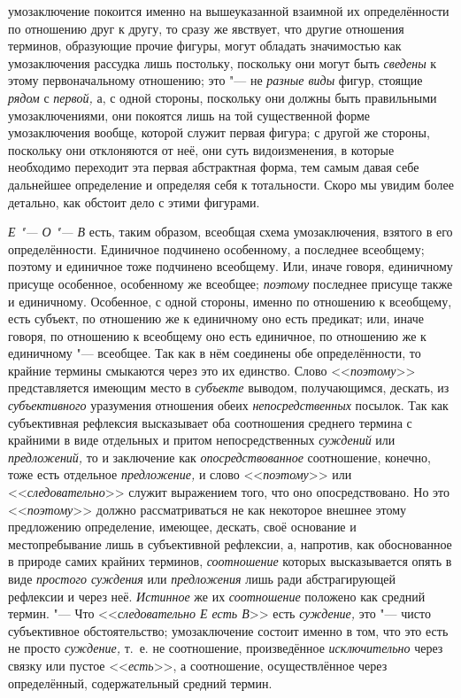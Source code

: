 умозаключение покоится именно на вышеуказанной взаимной их определённости
по отношению друг к другу, то сразу же явствует, что другие отношения
терминов, образующие прочие фигуры, могут обладать значимостью как
умозаключения рассудка лишь постольку, поскольку они могут быть
{\em сведены} к этому
первоначальному отношению; это "--- не
{\em разные виды} фигур,
стоящие {\em рядом} с
{\em первой,} а, с одной
стороны, поскольку они должны быть правильными умозаключениями, они
покоятся лишь на той существенной форме умозаключения вообще, которой
служит первая фигура; с другой же стороны, поскольку они отклоняются от
неё, они суть видоизменения, в которые необходимо переходит эта первая
абстрактная форма, тем самым давая себе дальнейшее определение и определяя
себя к тотальности. Скоро мы увидим более детально, как обстоит дело с
этими фигурами.

{\em Е "--- О "--- В} есть, таким образом, всеобщая схема
умозаключения, взятого в его определённости. Единичное подчинено
особенному, а последнее всеобщему; поэтому и единичное тоже подчинено
всеобщему. Или, иначе говоря, единичному присуще особенное, особенному же
всеобщее; {\em поэтому}
последнее присуще также и единичному. Особенное, с одной
стороны, именно по отношению к всеобщему, есть субъект, по отношению же к
единичному оно есть предикат; или, иначе говоря, по отношению к всеобщему
оно есть единичное, по отношению же к единичному "--- всеобщее.
Так как в нём соединены обе определённости, то крайние термины смыкаются
через это их единство. Слово
<<{\em поэтому}>>
представляется имеющим место в
{\em субъекте} выводом,
получающимся, дескать, из
{\em субъективного}
уразумения отношения обеих
{\em непосредственных}
посылок. Так как субъективная рефлексия высказывает оба
соотношения среднего термина с крайними в виде отдельных и притом
непосредственных {\em суждений}
или {\em предложений,}
то и заключение как
{\em опосредствованное}
соотношение, конечно, тоже есть отдельное
{\em предложение,} и
слово <<{\em поэтому}>> или
<<{\em следовательно}>>
служит выражением того, что оно опосредствовано. Но это
<<{\em поэтому}>> должно
рассматриваться не как некоторое внешнее этому предложению определение,
имеющее, дескать, своё основание и местопребывание лишь в субъективной
рефлексии, а, напротив, как обоснованное в природе самих крайних терминов,
{\em соотношение} которых
высказывается опять в виде {\em простого
суждения} или
{\em предложения} лишь
ради абстрагирующей рефлексии и через неё.
{\em Истинное} же их
{\em соотношение}
положено как средний термин. "--- Что
<<{\em следовательно Е есть В}>>
есть {\em суждение,}
это "--- чисто субъективное обстоятельство;
умозаключение состоит именно в том, что это есть не просто
{\em суждение,} т.~е. не
соотношение, произведённое
{\em исключительно} через
связку или пустое <<{\em есть}>>,
а соотношение, осуществлённое через определённый,
содержательный средний термин.

